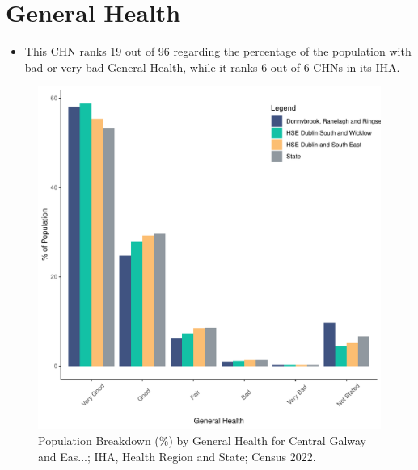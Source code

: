 \documentclass{article}
\begin{document}
\pagebreak

\section{General Health}\label{sect:GenHealth}
\begin{itemize}
\item  This CHN ranks  19 out of 96 regarding the percentage of the population with bad or very bad General Health, while it ranks   6 out of 6 CHNs in its IHA.
\end{itemize}
\begin{figure}[h]
	\centering
	\includegraphics[width = 150mm]{../figures/GenED.pdf}
	\caption{Population Breakdown (\%) by General Health for Central Galway and Eas...; IHA, Health Region and State;  Census 2022.}
	\label{fig:2ae19629-1a6a-13a3-e055-000000000001}
	\end{figure}
\end{document}
